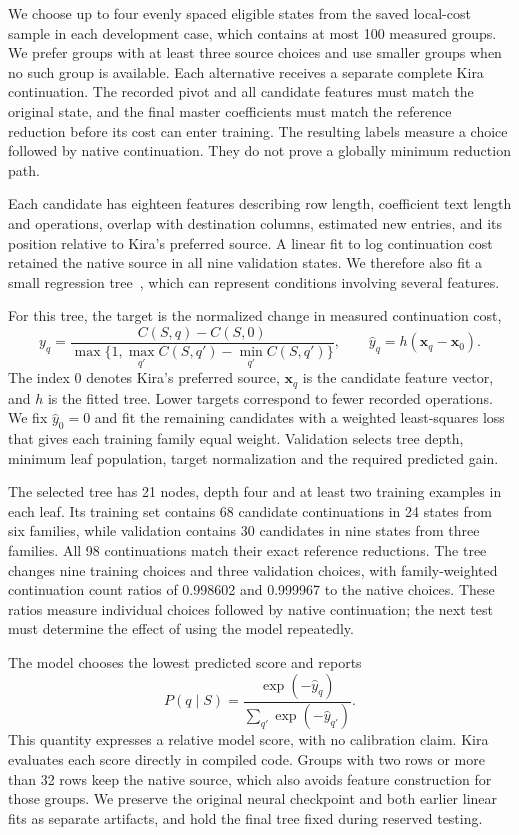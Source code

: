 We choose up to four evenly spaced eligible states from the saved
local-cost sample in each development case, which contains at most
100 measured groups. We prefer groups with at least three source
choices and use smaller groups when no such group is available. Each alternative receives a separate complete Kira continuation.
The recorded pivot and all candidate features must match the original
state, and the final master coefficients must match the reference
reduction before its cost can enter training. The resulting labels
measure a choice followed by native continuation. They do not prove a
globally minimum reduction path.

Each candidate has eighteen features describing row length, coefficient
text length and operations, overlap with destination columns, estimated
new entries, and its position relative to Kira's preferred source.
A linear fit to log continuation cost retained the native source in all
nine validation states. We therefore also fit a small regression tree~\cite{CART1984},
which can represent conditions involving several features.

For this tree, the target is the normalized change in measured
continuation cost,
\[
 y_q=\frac{C(S,q)-C(S,0)}
           {\max\{1,\max_{q'}C(S,q')-\min_{q'}C(S,q')\}},
 \qquad
 \widehat y_q=h(\boldsymbol x_q-\boldsymbol x_0).
\]
The index $0$ denotes Kira's preferred source, $\boldsymbol x_q$ is the
candidate feature vector, and $h$ is the fitted tree. Lower targets
correspond to fewer recorded operations. We fix $\widehat y_0=0$ and
fit the remaining candidates with a weighted least-squares loss that
gives each training family equal weight. Validation selects tree
depth, minimum leaf population, target normalization and the required
predicted gain.

The selected tree has 21 nodes, depth four and at least two training
examples in each leaf. Its training set contains 68 candidate
continuations in 24 states from six families, while validation contains
30 candidates in nine states from three families. All 98 continuations
match their exact reference reductions. The tree changes nine training
choices and three validation choices, with family-weighted continuation
count ratios of 0.998602 and 0.999967 to the native choices. These
ratios measure individual choices followed by native continuation;
the next test must determine the effect of using the model repeatedly.

The model chooses the lowest predicted score and reports
\[
 P(q\mid S)=\frac{\exp(-\widehat y_q)}
                 {\sum_{q'}\exp(-\widehat y_{q'})}.
\]
This quantity expresses a relative model score, with no calibration
claim. Kira evaluates each score directly in compiled code. Groups with two rows or more than
32 rows keep the native source, which also avoids feature construction
for those groups. We preserve the original neural checkpoint and both
earlier linear fits as separate artifacts, and hold the final tree
fixed during reserved testing.


